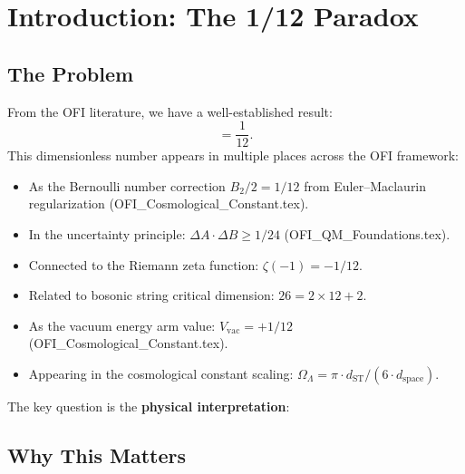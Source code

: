 \documentclass[12pt]{article}
\theoremstyle{definition}
\begin{document}
\section{Introduction: The 1/12 Paradox}
\label{sec:intro}

\subsection{The Problem}

From the OFI literature, we have a well-established result:
\begin{equation}
  [I\circ D,\, D\circ I] = \frac{1}{12}.
  \label{eq:ofi-commutator}
\end{equation}
This dimensionless number appears in multiple places across the OFI framework:
\begin{itemize}
  \item As the Bernoulli number correction $B_2/2 = 1/12$ from Euler--Maclaurin
    regularization (OFI_Cosmological_Constant.tex).
  \item In the uncertainty principle: $\Delta A \cdot \Delta B \geq 1/24$
    (OFI_QM_Foundations.tex).
  \item Connected to the Riemann zeta function: $\zeta(-1) = -1/12$.
  \item Related to bosonic string critical dimension: $26 = 2 \times 12 + 2$.
  \item As the vacuum energy arm value: $V_{\mathrm{vac}} = +1/12$
    (OFI_Cosmological_Constant.tex).
  \item Appearing in the cosmological constant scaling: $\Omega_\Lambda = \pi \cdot d_{\mathrm{ST}}/(6 \cdot d_{\mathrm{space}})$.
\end{itemize}

The key question is the \textbf{physical interpretation}:
\begin{center}
\end{center}

\subsection{Why This Matters}
\end{document}

